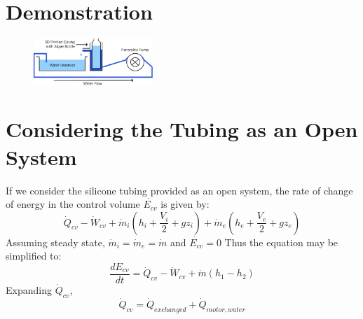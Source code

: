 \documentclass[10pt,a4paper]{IEEEtran}
\begin{document}
 	\section{Demonstration}
 		\begin{figure}[H]
 			\begin{center}
 				\includegraphics[width=0.4\textwidth]{demo_setup.png}
 				\caption{}
 				\label{fig:demo_setup}
 			\end{center}
 		\end{figure}
	 
	\section{Considering the Tubing as an Open System}
	If we consider the silicone tubing provided as an open system, the rate of change of energy in the control volume $\dot{E_{cv}}$ is given by:
	$$\dot{Q}_{cv} - \dot{W}_{cv} + \dot{m}_{i} \left( h_i + \frac{V_i}{2} + gz_i \right) + \dot{m}_{e} \left( h_e + \frac{V_e}{2} + gz_e \right)$$
	Assuming steady state, $\dot{m}_{i} = \dot{m}_{e} = \dot{m}$ and $\dot{E_{cv}} = 0$
	Thus the equation may be simplified to:
	$$\frac{dE_{cv}}{dt} = \dot{Q}_{cv} - \dot{W}_{cv} + \dot{m} \left( h_1 - h_2 \right)$$
	Expanding $\dot{Q}_{cv}$,
	$$\dot{Q}_{cv} = \dot{Q}_{exchanged} + \dot{Q}_{motor,water}$$
	
\end{document}
